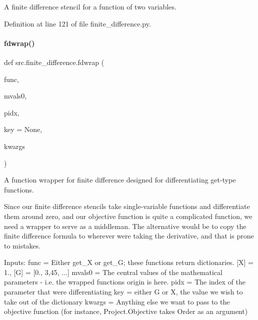 A finite difference stencil for a function of two variables. 



Definition at line 121 of file finite\+\_\+difference.\+py.

\mbox{\label{namespacesrc_1_1finite__difference_af3a9d7a4fc96a7057679fa5f3af73fe0}} 
\paragraph{\texorpdfstring{fdwrap()}{fdwrap()}}
{\footnotesize\ttfamily def src.\+finite\+\_\+difference.\+fdwrap (\begin{DoxyParamCaption}\item[{}]{func,  }\item[{}]{mvals0,  }\item[{}]{pidx,  }\item[{}]{key = {\ttfamily None},  }\item[{}]{kwargs }\end{DoxyParamCaption})}



A function wrapper for finite difference designed for differentiating \textquotesingle{}get\textquotesingle{}-\/type functions. 

Since our finite difference stencils take single-\/variable functions and differentiate them around zero, and our objective function is quite a complicated function, we need a wrapper to serve as a middleman. The alternative would be to copy the finite difference formula to wherever we\textquotesingle{}re taking the derivative, and that is prone to mistakes.

Inputs\+: func = Either get\+\_\+X or get\+\_\+G; these functions return dictionaries. \mbox{[}\textquotesingle{}X\textquotesingle{}\mbox{]} = 1., \mbox{[}\textquotesingle{}G\textquotesingle{}\mbox{]} = \mbox{[}0., 3,45, ...\mbox{]} mvals0 = The \textquotesingle{}central\textquotesingle{} values of the mathematical parameters -\/ i.\+e. the wrapped function\textquotesingle{}s origin is here. pidx = The index of the parameter that we\textquotesingle{}re differentiating key = either \textquotesingle{}G\textquotesingle{} or \textquotesingle{}X\textquotesingle{}, the value we wish to take out of the dictionary kwargs = Anything else we want to pass to the objective function (for instance, Project.\+Objective takes Order as an argument)

